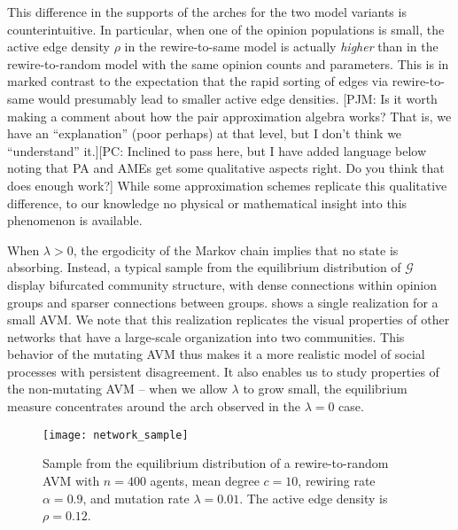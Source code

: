 \documentclass[review, onefignum, onetabnum]{siamart171218}
\newcommand{\pjm}[1]{{\color{blue}[PJM: #1]}}
\newcommand{\pc}[1]{{\color{comment_purple}[PC: #1]}}
\begin{document}
		This difference in the supports of the arches for the two model variants is counterintuitive. 
		In particular, when one of the opinion populations is small, the active edge density $\rho$ in the rewire-to-same model is actually \emph{higher} than in the rewire-to-random model with the same opinion counts and parameters.  
		This is in marked contrast to the expectation that the rapid sorting of edges via rewire-to-same would presumably lead to  smaller active edge densities. \pjm{Is it worth making a comment about how the pair approximation algebra works? That is, we have an ``explanation'' (poor perhaps) at that level, but I don't think we ``understand'' it.}\pc{Inclined to pass here, but I have added language below noting that PA and AMEs get some qualitative aspects right. Do you think that does enough work?}
		While some approximation schemes \cite{Durrett2012} replicate this qualitative difference, to our knowledge no physical or mathematical insight into this phenomenon is available. 

		When $\lambda > 0$, the ergodicity of the Markov chain implies that no state is absorbing. 
		Instead, a typical sample from the equilibrium distribution of $\mathcal{G}$ display bifurcated community structure, with dense connections within opinion groups and sparser connections between groups. 
		 shows a single realization for a small AVM. 
		We note that this realization replicates the visual properties of other networks that have a large-scale organization into two communities. 
		This behavior of the mutating AVM thus makes it a more realistic model of social processes with persistent disagreement. 
		It also enables us to study properties of the non-mutating AVM -- when we allow $\lambda$ to grow small, the equilibrium measure concentrates around the arch observed in the $\lambda = 0$ case. 
		\begin{figure}
			\centering
			\texttt{[image: network\_sample]}
			\caption{Sample from the equilibrium distribution of a rewire-to-random AVM with $n = 400$ agents, mean degree $c = 10$, rewiring rate $\alpha = 0.9$, and mutation rate $\lambda = 0.01$. The active edge density is $\rho = 0.12$.} \label{fig:sample}
		\end{figure}
\end{document}
